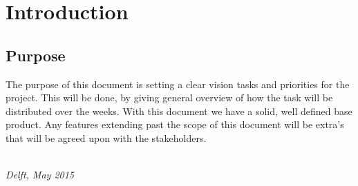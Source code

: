 \chapter{Introduction}

\section*{Purpose}
The purpose of this document is setting a clear vision tasks and priorities for the project. This will be done, by giving general overview of how the task will be distributed over the weeks. With this document we have a solid, well defined base product. Any features extending past the scope of this document will be extra's that will be agreed upon with the stakeholders.
\begin{flushright}
{\makeatletter\itshape
    \@author \\
    Delft, May 2015
\makeatother}
\end{flushright}

